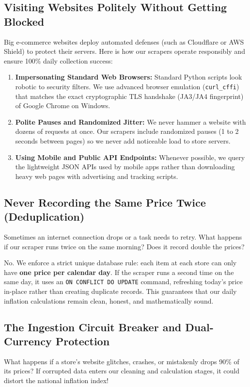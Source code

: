 \documentclass[11pt,a4paper,oneside]{article}
\begin{document}
\subsection{Visiting Websites Politely Without Getting Blocked}
Big e-commerce websites deploy automated defenses (such as Cloudflare or AWS Shield) to protect their servers. Here is how our scrapers operate responsibly and ensure 100\% daily collection success:
\begin{enumerate}
    \item \textbf{Impersonating Standard Web Browsers:} Standard Python scripts look robotic to security filters. We use advanced browser emulation (\texttt{curl\_cffi}) that matches the exact cryptographic TLS handshake (JA3/JA4 fingerprint) of Google Chrome on Windows.
    \item \textbf{Polite Pauses and Randomized Jitter:} We never hammer a website with dozens of requests at once. Our scrapers include randomized pauses (1 to 2 seconds between pages) so we never add noticeable load to store servers.
    \item \textbf{Using Mobile and Public API Endpoints:} Whenever possible, we query the lightweight JSON APIs used by mobile apps rather than downloading heavy web pages with advertising and tracking scripts.
\end{enumerate}

\subsection{Never Recording the Same Price Twice (Deduplication)}
Sometimes an internet connection drops or a task needs to retry. What happens if our scraper runs twice on the same morning? Does it record double the prices?

No. We enforce a strict unique database rule: each item at each store can only have \textbf{one price per calendar day}. If the scraper runs a second time on the same day, it uses an \texttt{ON CONFLICT DO UPDATE} command, refreshing today's price in-place rather than creating duplicate records. This guarantees that our daily inflation calculations remain clean, honest, and mathematically sound.

\subsection{The Ingestion Circuit Breaker and Dual-Currency Protection}
What happens if a store's website glitches, crashes, or mistakenly drops 90\% of its prices? If corrupted data enters our cleaning and calculation stages, it could distort the national inflation index!
\end{document}
